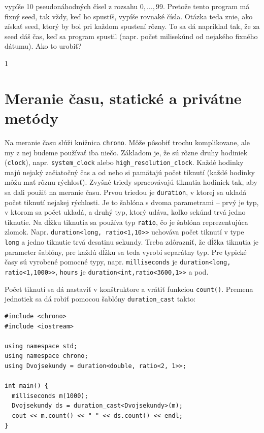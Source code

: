 \documentclass[10pt]{article}
\def\prg{\lstinline}
\def\ods{\vspace*{10pt}}
\def\sectxxviii{1} %
\def\sectxxviii{0} %
\begin{document}
{vypíše 10 pseudonáhodných čísel z rozsahu $0,\ldots,99$.
Pretože tento program má fixný seed, tak vždy, keď ho spustíš, vypíše rovnaké
čísla. Otázka teda znie, ako získať seed, ktorý by bol pri každom 
spustení rôzny. To sa dá
napríklad tak, že za seed dáš čas, keď sa program spustil (napr. počet milisekúnd
od nejakého fixného dátumu). Ako to urobiť?
\fi

\if\sectxxviii1
\section{Meranie času, statické a privátne metódy}

Na meranie času slúži knižnica {\tt chrono}. 
Môže pôsobiť trochu komplikovane, ale my z
nej budeme používať iba niečo. Základom je, že sú rôzne druhy hodiniek ({\tt clock}),
napr. \prg!system_clock! alebo \prg!high_resolution_clock!. Každé hodinky majú
nejaký začiatočný čas a od neho si pamätajú počet tiknutí (každé hodinky môžu mať
rôznu rýchlosť).
Zvyšné triedy spracovávajú tiknutia hodiniek tak, aby sa
dali použiť na meranie času. Prvou triedou je {\tt duration}, v ktorej sa ukladá počet
tiknutí nejakej rýchlosti. Je to šablóna s dvoma parametrami -- prvý je typ, v ktorom
sa počet ukladá, a druhý typ, ktorý udáva, koľko sekúnd trvá jedno tiknutie.
Na dĺžku tiknutia sa používa typ \prg!ratio!, čo je šablóna reprezentujúca zlomok.
Napr. \prg!duration<long, ratio<1,10>>! 
uchováva počet tiknutí v type \prg!long!
a jedno tiknutie trvá desatinu sekundy. 
Treba zdôrazniť, že dĺžka tiknutia je parameter šablóny, 
pre každú dĺžku sa teda vyrobí separátny typ. 
Pre typické časy sú vyrobené pomocné typy, napr. \prg!milliseconds!
je \prg!duration<long, ratio<1,1000>>!, \prg!hours! je \prg!duration<int,ratio<3600,1>>!
a pod.

\ods
Počet tiknutí sa dá nastaviť v konštruktore a vrátiť funkciou \prg!count()!.
Premena jednotiek sa dá robiť pomocou šablóny \prg!duration_cast! takto:

\begin{lstlisting}
#include <chrono>
#include <iostream>

using namespace std;
using namespace chrono;
using Dvojsekundy = duration<double, ratio<2, 1>>;

int main() {
  milliseconds m(1000);
  Dvojsekundy ds = duration_cast<Dvojsekundy>(m);
  cout << m.count() << " " << ds.count() << endl;
} 

\end{lstlisting}

}
\end{document}
